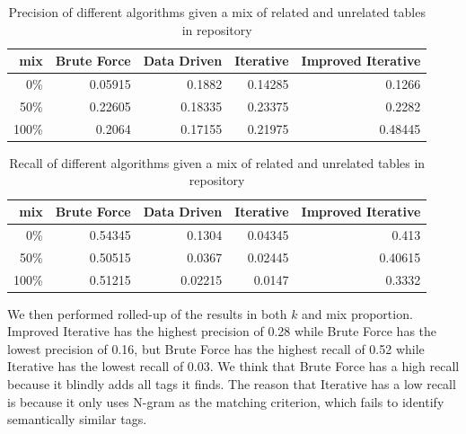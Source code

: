\begin{table}[h!]
    \centering
    \scriptsize
    \begin{center}
      \caption{Precision of different algorithms given a mix of related and unrelated tables in repository}
      \label{tab:Precision-of-different-algorithms-given-a-mix-of-related-and-unrelated-tables-in-repository}
      \begin{tabular}{|r|r|r|r|r|}
        \hline
        \textbf{mix} & \textbf{Brute Force} & \textbf{Data Driven} & \textbf{Iterative} & \textbf{Improved Iterative} \\
        \hline
        0\% & 0.05915 & 0.1882 & 0.14285 & 0.1266 \\
        \hline
        50\% & 0.22605 & 0.18335 & 0.23375 & 0.2282 \\
        \hline
        100\% & 0.2064 & 0.17155 & 0.21975 & 0.48445 \\
        \hline
      \end{tabular}
    \end{center}
\end{table}

\begin{table}[h!]
    \centering
    \scriptsize
    \begin{center}
      \caption{Recall of different algorithms given a mix of related and unrelated tables in repository}
      \label{tab:Recall-of-different-algorithms-given-a-mix-of-related-and-unrelated-tables-in-repository}
      \begin{tabular}{|r|r|r|r|r|}
        \hline
        \textbf{mix} & \textbf{Brute Force} & \textbf{Data Driven} & \textbf{Iterative} & \textbf{Improved Iterative} \\
        \hline
        0\% & 0.54345 & 0.1304 & 0.04345 & 0.413 \\
        \hline
        50\% & 0.50515 & 0.0367 & 0.02445 & 0.40615 \\
        \hline
        100\% & 0.51215 & 0.02215 & 0.0147 & 0.3332 \\
        \hline        
      \end{tabular}
    \end{center}
\end{table}

We then performed rolled-up of the results in both $k$ and mix proportion. Improved Iterative has the highest precision of 0.28 while Brute Force has the lowest precision of 0.16, but Brute Force has the highest recall of 0.52 while Iterative has the lowest recall of 0.03. We think that Brute Force has a high recall because it blindly adds all tags it finds. The reason that Iterative has a low recall is because it only uses N-gram as the matching criterion, which fails to identify semantically similar tags.

